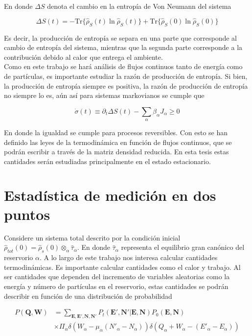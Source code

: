 En donde $\Delta S$ denota el cambio en la entropía de Von Neumann del sistema

\begin{equation*}
    \Delta S(t) = -  \text{Tr}\{\hat{\rho}_{S}(t)\ln \hat{\rho}_{S}(t) \} +  \text{Tr}\{ \hat{\rho}_{S}(0)\ln \hat{\rho}_{S}(0) \}
\end{equation*}

Es decir, la producción de entropía se separa en una parte que corresponde al cambio de entropía del sistema, mientras que la segunda parte corresponde a la contribución debido al calor que entrega el ambiente.\\
Como en este trabajo se hará análisis de flujos continuos tanto de energía como de partículas, es importante estudiar la razón de producción de entropía. Si bien, la producción de entropía siempre es positiva, la razón de producción de entropía no siempre lo es, aún así para sistemas markovianos se cumple que \cite{strasberg2019non}

\begin{equation*}
    \dot{\sigma}(t) \equiv \partial_{t}\Delta S(t) - \sum_{\alpha}\beta_{\alpha}J_{\alpha} \geq 0
\end{equation*}

En donde la igualdad se cumple para procesos reversibles. Con esto se han definido las leyes de la termodinámica en función de flujos continuos, que se podrán escribir a través de la matriz densidad reducida. En esta tesis estas cantidades serán estudiadas principalmente en el estado estacionario.

\label{sec3sub:leyestermo}

\section{Estadística de medición en dos puntos}
Considere un sistema total descrito por la condición inicial $\hat{\rho}_{tot}(0) = \hat{\rho}_{s}(0) \otimes_{\alpha} \hat{\tau}_{\alpha}$. En donde $\hat{\tau}_{\alpha}$ representa el equilibrio gran canónico del reservorio $\alpha$. A lo largo de este trabajo nos interesa calcular cantidades termodinámicas. Es importante calcular cantidades como el calor y trabajo. Al ser cantidades que dependen del incremento de variables aleatorias como la energía y número de partículas en el reservorio, estas cantidades se podrán describir en función de una distribución de probabilidad

\begin{align*}
    P(\textbf{Q},\textbf{W}) & = \sum_{\textbf{E},\textbf{E}',\textbf{N},\textbf{N}'} P_{t}(\textbf{E}',\textbf{N}'|\textbf{E},\textbf{N}) P_{0}(\textbf{E},\textbf{N})\\
                             & \times \Pi_{\alpha} \delta(W_{\alpha} - \mu_{\alpha}(N'_{\alpha} - N_{\alpha})) \delta(Q_{\alpha} + W_{\alpha}  - (E'_{\alpha} - E_{\alpha}))   
\end{align*}

